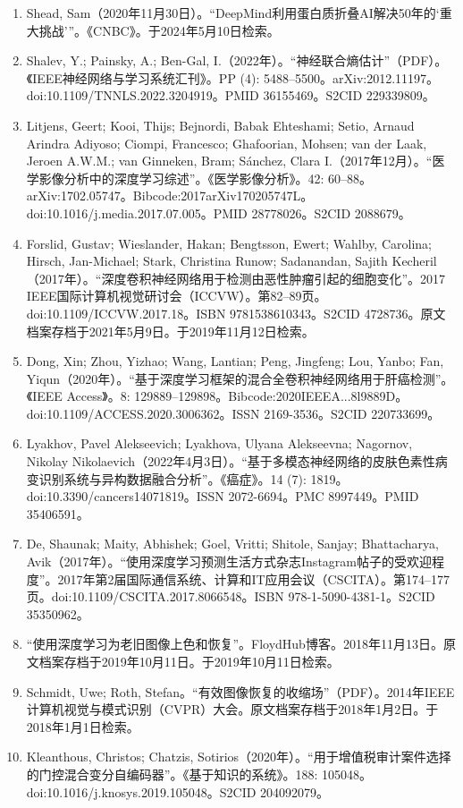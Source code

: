 \begin{enumerate}
\item Shead, Sam（2020年11月30日）。“DeepMind利用蛋白质折叠AI解决50年的‘重大挑战’”。《CNBC》。于2024年5月10日检索。
\item Shalev, Y.; Painsky, A.; Ben-Gal, I.（2022年）。“神经联合熵估计”（PDF）。《IEEE神经网络与学习系统汇刊》。PP (4): 5488–5500。arXiv:2012.11197。doi:10.1109/TNNLS.2022.3204919。PMID 36155469。S2CID 229339809。
\item Litjens, Geert; Kooi, Thijs; Bejnordi, Babak Ehteshami; Setio, Arnaud Arindra Adiyoso; Ciompi, Francesco; Ghafoorian, Mohsen; van der Laak, Jeroen A.W.M.; van Ginneken, Bram; Sánchez, Clara I.（2017年12月）。“医学影像分析中的深度学习综述”。《医学影像分析》。42: 60–88。arXiv:1702.05747。Bibcode:2017arXiv170205747L。doi:10.1016/j.media.2017.07.005。PMID 28778026。S2CID 2088679。
\item Forslid, Gustav; Wieslander, Hakan; Bengtsson, Ewert; Wahlby, Carolina; Hirsch, Jan-Michael; Stark, Christina Runow; Sadanandan, Sajith Kecheril（2017年）。“深度卷积神经网络用于检测由恶性肿瘤引起的细胞变化”。2017 IEEE国际计算机视觉研讨会（ICCVW）。第82–89页。doi:10.1109/ICCVW.2017.18。ISBN 9781538610343。S2CID 4728736。原文档案存档于2021年5月9日。于2019年11月12日检索。
\item Dong, Xin; Zhou, Yizhao; Wang, Lantian; Peng, Jingfeng; Lou, Yanbo; Fan, Yiqun（2020年）。“基于深度学习框架的混合全卷积神经网络用于肝癌检测”。《IEEE Access》。8: 129889–129898。Bibcode:2020IEEEA...8l9889D。doi:10.1109/ACCESS.2020.3006362。ISSN 2169-3536。S2CID 220733699。
\item Lyakhov, Pavel Alekseevich; Lyakhova, Ulyana Alekseevna; Nagornov, Nikolay Nikolaevich（2022年4月3日）。“基于多模态神经网络的皮肤色素性病变识别系统与异构数据融合分析”。《癌症》。14 (7): 1819。doi:10.3390/cancers14071819。ISSN 2072-6694。PMC 8997449。PMID 35406591。
\item De, Shaunak; Maity, Abhishek; Goel, Vritti; Shitole, Sanjay; Bhattacharya, Avik（2017年）。“使用深度学习预测生活方式杂志Instagram帖子的受欢迎程度”。2017年第2届国际通信系统、计算和IT应用会议（CSCITA）。第174–177页。doi:10.1109/CSCITA.2017.8066548。ISBN 978-1-5090-4381-1。S2CID 35350962。
\item “使用深度学习为老旧图像上色和恢复”。FloydHub博客。2018年11月13日。原文档案存档于2019年10月11日。于2019年10月11日检索。
\item Schmidt, Uwe; Roth, Stefan。“有效图像恢复的收缩场”（PDF）。2014年IEEE计算机视觉与模式识别（CVPR）大会。原文档案存档于2018年1月2日。于2018年1月1日检索。
\item Kleanthous, Christos; Chatzis, Sotirios（2020年）。“用于增值税审计案件选择的门控混合变分自编码器”。《基于知识的系统》。188: 105048。doi:10.1016/j.knosys.2019.105048。S2CID 204092079。

\end{enumerate}
